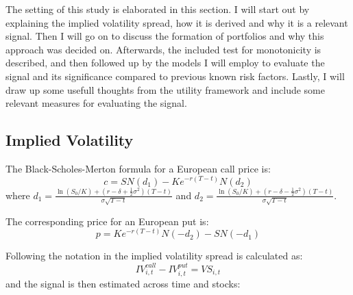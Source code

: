 
The setting of this study is elaborated in this section. I will start out by explaining the implied volatility spread, how it is derived and why it is a relevant signal. Then I will go on to discuss the formation of portfolios and why this approach was decided on. Afterwards, the included test for monotonicity is described, and then followed up by the models I will employ to evaluate the signal and its significance compared to previous known risk factors. Lastly, I will draw up some usefull thoughts from the utility framework and include some relevant measures for evaluating the signal.


\subsection{Implied Volatility}



The Black-Scholes-Merton formula for a European call price is:
\begin{equation}
	c=SN\left(d_{1}\right)-Ke^{-r\left(T-t\right)}N\left(d_{2}\right)
\end{equation}
where $d_{1}=\frac{\ln\left(S_{0}/K\right)+\left(r-\delta+\frac{1}{2}\sigma^{2}\right)\left(T-t\right)}{\sigma\sqrt{T-t}}$
and 
$d_{2}=\frac{\ln\left(S_{0}/K\right)+\left(r-\delta-\frac{1}{2}\sigma^{2}\right)\left(T-t\right)}{\sigma\sqrt{T-t}}$.

The corresponding price for an European put is:
\begin{equation}
	p=Ke^{-r\left(T-t\right)}N\left(-d_{2}\right)-SN\left(-d_{1}\right)
\end{equation}


Following the notation in \cite{cremers2010deviations} the implied volatility spread is calculated as:
\begin{equation}
	IV_{i,t}^{call}-IV_{i,t}^{put}=VS_{i,t}
\end{equation}
 and the signal is then estimated across time and stocks:
  
